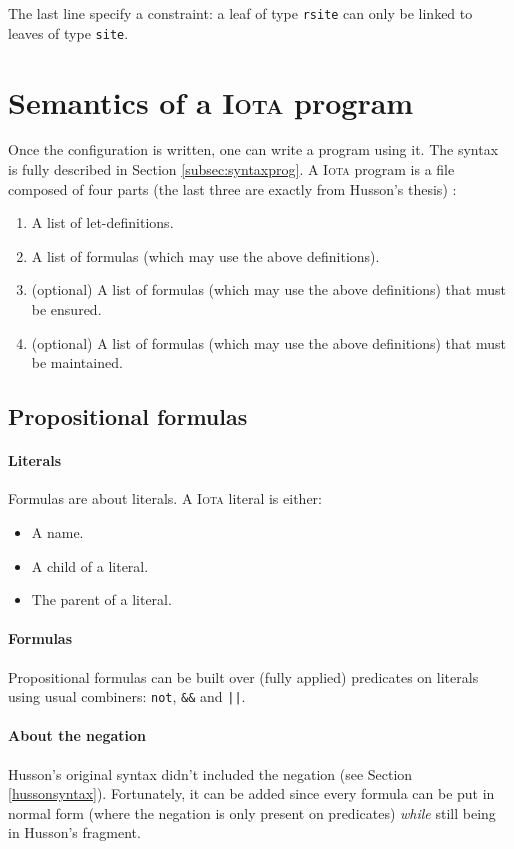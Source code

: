 \documentclass[10pt,a4paper]{article}
\newcommand\Iota{\textsc{Iota}}
\newcommand{\ocaml}{\texttt}
\begin{document}
The last line specify a constraint: a leaf of type \ocaml{rsite} can only be linked to leaves of type \ocaml{site}.

\section{Semantics of a \Iota{} program}
Once the configuration is written, one can write a program using it. The syntax is fully described in Section \ref{subsec:syntaxprog}. A \Iota{} program is a file composed of four parts (the last three are exactly from Husson's thesis) :

\begin{enumerate}
\item A list of let-definitions.
\item A list of formulas (which may use the above definitions).
\item (optional) A list of formulas (which may use the above definitions) that must be ensured.
\item (optional) A list of formulas (which may use the above definitions) that must be maintained.
\end{enumerate}

\subsection{Propositional formulas}
\paragraph{Literals}
Formulas are about literals. A \Iota{} literal is either:
\begin{multicols}{2}
  \begin{itemize}
  \item A name.
  \item A child of a literal.
  \item The parent of a literal.
  \end{itemize}
\end{multicols}

\paragraph{Formulas}
Propositional formulas can be built over (fully applied) predicates on literals using usual combiners: \ocaml{not}, \ocaml{&&} and \ocaml{||}.

\paragraph{About the negation}
Husson's original syntax didn't included the negation (see Section \ref{hussonsyntax}). Fortunately, it can be added since every formula can be put in normal form (where the negation is only present on predicates) \emph{while} still being in Husson's fragment.
\end{document}
